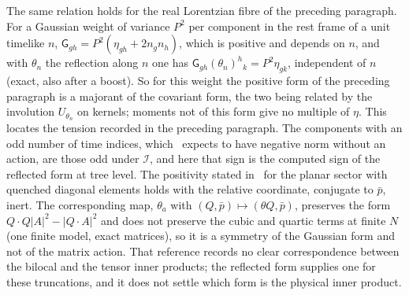 The same relation holds for the real Lorentzian fibre of the preceding paragraph. For a Gaussian weight of variance \(P^2\) per component in the rest frame of a unit timelike \(n\), \(\mathsf G_{gh}=P^2(\eta_{gh}+2n_gn_h)\), which is positive and depends on \(n\), and with \(\theta_n\) the reflection along \(n\) one has \(\mathsf G_{gh}(\theta_n)^h{}_k=P^2\eta_{gk}\), independent of \(n\) (exact, also after a boost). So for this weight the positive form of the preceding paragraph is a majorant of the covariant form, the two being related by the involution \(U_{\theta_n}\) on kernels; moments not of this form give no multiple of \(\eta\). This locates the tension recorded in the preceding paragraph. The components with an odd number of time indices, which~\cite{FurutaHanadaKawaiKimura2007} expects to have negative norm without an action, are those odd under \(\mathcal I\), and here that sign is the computed sign of the reflected form at tree level. The positivity stated in~\cite{HoKawaiSteinacker2025} for the planar sector with quenched diagonal elements holds with the relative coordinate, conjugate to \(\bar p\), inert. The corresponding map, \(\theta_a\) with \((Q,\bar p)\mapsto(\theta Q,\bar p)\), preserves the form \(Q\cdot Q|A|^2-|Q\cdot A|^2\) and does not preserve the cubic and quartic terms at finite \(N\) (one finite model, exact matrices), so it is a symmetry of the Gaussian form and not of the matrix action. That reference records no clear correspondence between the bilocal and the tensor inner products; the reflected form supplies one for these truncations, and it does not settle which form is the physical inner product.

